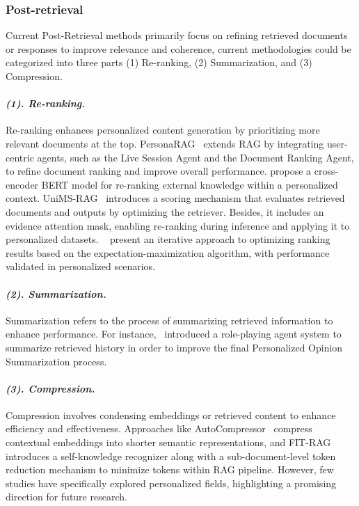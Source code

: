 \subsubsection{\textbf{Post-retrieval}}
Current Post-Retrieval methods primarily focus on refining retrieved documents or responses to improve relevance and coherence, current methodologies could be categorized into three parts (1) Re-ranking, (2) Summarization, and (3) Compression.

\paragraph{\textbf{\textit{{(1). Re-ranking.}}}}
Re-ranking enhances personalized content generation by prioritizing more relevant documents at the top. PersonaRAG~\cite{zerhoudi2024personarag} extends RAG by integrating user-centric agents, such as the Live Session Agent and the Document Ranking Agent, to refine document ranking and improve overall performance. \citet{pavliukevich2024improving} propose a cross-encoder BERT model for re-ranking external knowledge within a personalized context. UniMS-RAG~\cite{wang2024unims} introduces a scoring mechanism that evaluates retrieved documents and outputs by optimizing the retriever. Besides, it includes an evidence attention mask, enabling re-ranking during inference and applying it to personalized datasets. ~\citet{salemi2024learning} present an iterative approach to optimizing ranking results based on the expectation-maximization algorithm, with performance validated in personalized scenarios.


\paragraph{\textbf{\textit{{(2). Summarization.}}}}
Summarization refers to the process of summarizing retrieved information to enhance performance. For instance,~\citet{zhang2025rehearse} introduced a role-playing agent system to summarize retrieved history in order to improve the final Personalized Opinion Summarization process.

\paragraph{\textbf{\textit{{(3). Compression.}}}}
Compression involves condensing embeddings or retrieved content to enhance efficiency and effectiveness. Approaches like AutoCompressor~\cite{chevalier2023adapting} compress contextual embeddings into shorter semantic representations, and FIT-RAG~\cite{mao2024fit} introduces a self-knowledge recognizer along with a sub-document-level token reduction mechanism to minimize tokens within RAG pipeline. However, few studies have specifically explored personalized fields, highlighting a promising direction for future research.

